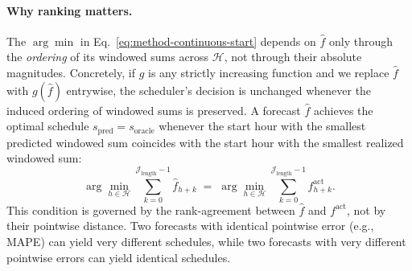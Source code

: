 \paragraph{Why ranking matters.}
The $\arg\min$ in Eq.~\ref{eq:method-continuous-start} depends on $\hat{f}$ only through the \textit{ordering} of its windowed sums across $\mathcal{H}$, not through their absolute magnitudes.
Concretely, if $g$ is any strictly increasing function and we replace $\hat{f}$ with $g(\hat{f})$ entrywise, the scheduler's decision is unchanged whenever the induced ordering of windowed sums is preserved.
A forecast $\hat{f}$ achieves the optimal schedule $s_{\text{pred}} = s_{\text{oracle}}$ whenever the start hour with the smallest predicted windowed sum coincides with the start hour with the smallest realized windowed sum:
\begin{equation}
    \arg\min_{h \in \mathcal{H}} \sum_{k=0}^{\mathcal{J}_{\text{length}}-1} \hat{f}_{h+k} \;=\; \arg\min_{h \in \mathcal{H}} \sum_{k=0}^{\mathcal{J}_{\text{length}}-1} f^{\text{act}}_{h+k}.
    \label{eq:method-argmin-agreement}
\end{equation}
This condition is governed by the rank-agreement between $\hat{f}$ and $f^{\text{act}}$, not by their pointwise distance.
Two forecasts with identical pointwise error (e.g., MAPE) can yield very different schedules, while two forecasts with very different pointwise errors can yield identical schedules.

